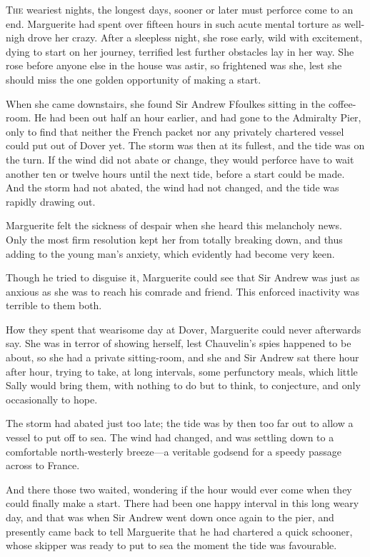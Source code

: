 \documentclass[paper=5.5in:8.5in,BCOR=7mm,twoside,DIV=calc,12pt,usegeometry,chapterprefix,endperiod,headings=big]{scrbook}
\begin{document}
\lettrine[lines=4]{T}{he} weariest nights, the longest days, sooner or later must perforce come to an end. Marguerite had spent over fifteen hours in such acute mental torture as well-nigh drove her crazy. After a sleepless night, she rose early, wild with excitement, dying to start on her journey, terrified lest further obstacles lay in her way. She rose before anyone else in the house was astir, so frightened was she, lest she should miss the one golden opportunity of making a start.

When she came downstairs, she found Sir Andrew \newline Ffoulkes sitting in the coffee-room. He had been out half an hour earlier, and had gone to the Admiralty Pier, only to find that neither the French packet nor any privately chartered vessel could put out of Dover yet. The storm was then at its fullest, and the tide was on the turn. If the wind did not abate or change, they would perforce have to wait another ten or twelve hours until the next tide, before a start could be made. And the storm had not abated, the wind had not changed, and the tide was rapidly drawing out.

Marguerite felt the sickness of despair when she heard this melancholy news. Only the most firm resolution kept her from totally breaking down, and thus adding to the young man's anxiety, which evidently had become very keen.

Though he tried to disguise it, Marguerite could see that Sir Andrew was just as anxious as she was to reach his comrade and friend. This enforced inactivity was terrible to them both.

How they spent that wearisome day at Dover, Marguerite could never afterwards say. She was in terror of showing herself, lest Chauvelin's spies happened to be about, so she had a private sitting-room, and she and Sir Andrew sat there hour after hour, trying to take, at long intervals, some perfunctory meals, which little Sally would bring them, with nothing to do but to think, to conjecture, and only occasionally to hope.

The storm had abated just too late; the tide was by then too far out to allow a vessel to put off to sea. The wind had changed, and was settling down to a comfortable north-westerly breeze---a veritable godsend for a \newline speedy passage across to France.

And there those two waited, wondering if the hour would ever come when they could finally make a start. There had been one happy interval in this long weary day, and that was when Sir Andrew went down once again to the pier, and presently came back to tell Marguerite that he had chartered a quick schooner, whose skipper was ready to put to sea the moment the tide was favourable.
\end{document}
